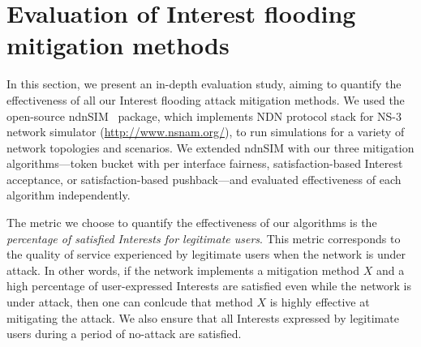 \section{Evaluation of Interest flooding mitigation methods}
\label{sec:evaluation}




In this section, we present an in-depth evaluation study, aiming to quantify the effectiveness of all our Interest flooding attack mitigation methods.
We used the open-source ndnSIM~\cite{ndnsim} package, which implements NDN protocol stack for NS-3 network simulator (\url{http://www.nsnam.org/}), to run simulations for a variety of network topologies and scenarios. 
We extended ndnSIM with our three mitigation algorithms---token bucket with per interface fairness, satisfaction-based Interest acceptance, or satisfaction-based pushback---and evaluated effectiveness of each algorithm independently.




The metric we choose to quantify the effectiveness of our algorithms is the {\it percentage of satisfied Interests for legitimate users}. This metric corresponds to the quality of service experienced by legitimate users when the network is under attack. In other words, if the network implements a mitigation method $X$ and a high percentage of user-expressed Interests are satisfied even while the network is under attack, then one can conlcude that method $X$ is highly effective at mitigating the attack. We also ensure that all Interests expressed by legitimate users during a period of no-attack are satisfied.
 
